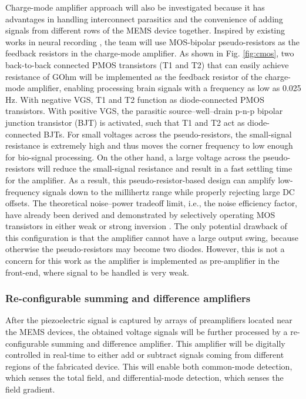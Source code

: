 Charge-mode amplifier approach will also be investigated because it has advantages in handling interconnect parasitics and the convenience of adding signals from different rows of the MEMS device together. Inspired by existing works in neural recording \cite{harrison2003low}, the team will use MOS-bipolar pseudo-resistors as the feedback resistors in the charge-mode amplifier. As shown in Fig. \ref{fig:cmos}, two back-to-back connected PMOS transistors (T1 and T2) that can easily achieve resistance of GOhm will be implemented as the feedback resistor of the charge-mode amplifier, enabling processing brain signals with a frequency as low as 0.025 Hz. With negative VGS, T1 and T2 function as diode-connected PMOS transistors. With positive VGS, the parasitic source–well–drain p-n-p bipolar junction transistor (BJT) is activated, such that T1 and T2 act as diode-connected BJTs. For small voltages across the pseudo-resistors, the small-signal resistance is extremely high and thus moves the corner frequency to low enough for bio-signal processing. On the other hand, a large voltage across the pseudo-resistors will reduce the small-signal resistance and result in a fast settling time for the amplifier. As a result, this pseudo-resistor-based design can amplify low-frequency signals down to the millihertz range while properly rejecting large DC offsets. The theoretical noise–power tradeoff limit, i.e., the noise efficiency factor, have already been derived and demonstrated by selectively operating MOS transistors in either weak or strong inversion \cite{harrison2003low}. The only potential drawback of this configuration is that the amplifier cannot have a large output swing, because otherwise the pseudo-resistors may become two diodes. However, this is not a concern for this work as the amplifier is implemented as pre-amplifier in the front-end, where signal to be handled is very weak.

\subsubsection{Re-configurable summing and difference amplifiers}

After the piezoelectric signal is captured by arrays of preamplifiers located near the MEMS devices, the obtained voltage signals will be further processed by a re-configurable summing and difference amplifier. This amplifier will be digitally controlled in real-time to either add or subtract signals coming from different regions of the fabricated device. This will enable both common-mode detection, which senses the total field, and differential-mode detection, which senses the field gradient.

